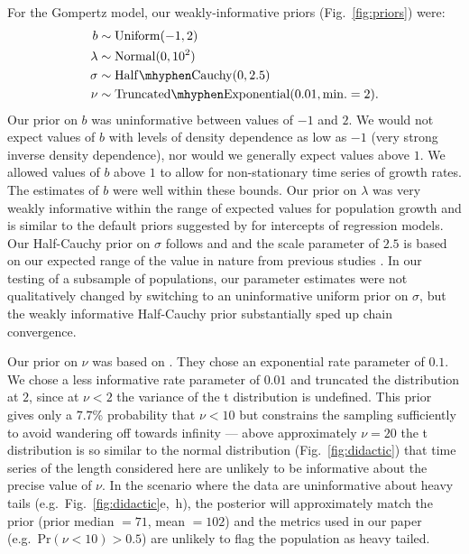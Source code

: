 For the Gompertz model, our weakly-informative priors (Fig.~\ref{fig:priors}) were:
\begin{align*}
b &\sim \mathrm{Uniform}(-1, 2)\\ \lambda &\sim \mathrm{Normal}(0, 10^2)\\
\sigma &\sim \mathrm{Half\mhyphen Cauchy} (0, 2.5)\\ \nu &\sim
\mathrm{Truncated\mhyphen Exponential}(0.01, \mathrm{min.} = 2).
\end{align*}
Our prior on $b$ was uninformative between values of $-1$ and $2$. We would not expect values of $b$ with levels of density dependence as low as $-1$ (very strong inverse density dependence), nor would we generally expect values above $1$. We allowed values of $b$ above $1$ to allow for non-stationary time series of growth rates. The estimates of $b$ were well within these bounds. Our prior on $\lambda$ was very weakly informative within the range of expected values for population growth and is similar to the default priors suggested by \citet{gelman2008d} for intercepts of regression models. Our Half-Cauchy prior on $\sigma$ follows \citet{gelman2006c} and \citet{gelman2008d} and the scale parameter of $2.5$ is based on our expected range of the value in nature from previous studies \citep[e.g.][]{connors2014}. In our testing of a subsample of populations, our parameter estimates were not qualitatively changed by switching to an uninformative uniform prior on $\sigma$, but the weakly informative Half-Cauchy prior substantially sped up chain convergence.

Our prior on $\nu$ was based on \citet{fernandez1998}. They chose an exponential rate parameter of $0.1$. We chose a less informative rate parameter of $0.01$ and truncated the distribution at $2$, since at $\nu < 2$ the variance of the t distribution is undefined. This prior gives only a $7.7$\% probability that $\nu < 10$ but constrains the sampling sufficiently to avoid wandering off towards infinity --- above approximately $\nu = 20$ the t distribution is so similar to the normal distribution (Fig.~\ref{fig:didactic}) that time series of the length considered here are unlikely to be informative about the precise value of $\nu$. In the scenario where the data are uninformative about heavy tails (e.g.~Fig.~\ref{fig:didactic}e,~h), the posterior will approximately match the prior (prior median $= 71$, mean $= 102$) and the metrics used in our paper (e.g.~Pr$(\nu < 10) > 0.5$) are unlikely to flag the population as heavy tailed.

